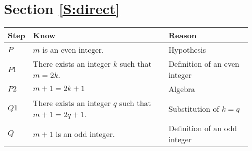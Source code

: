 \section*{Section \ref{S:direct}}

\begin{list}{\bf{\ref{exer:evenodd}.}}
\item \begin{list}{\bf{(a)}} \item 
\begin{tabular}[t]{|p{0.4in}|p{1.6in}|p{1.6in}|}
  \hline
  \textbf{Step}  &  \textbf{Know}  &  \textbf{Reason} \\ \hline
  $P$  &  $m$ is an even integer.  &  Hypothesis \\ \hline
  $P1$ &  There exists an integer $k$ such that $m = 2k$. &  Definition of an even integer \\ \hline
  $P2$  &  $m + 1 = 2k + 1$  &  Algebra \\ \hline
  $Q1$  &  There exists an integer $q$ such that $m +1 = 2q+1$.  &  Substitution of $k = q$ \\ \hline
  $Q$  &  $m + 1$ is an odd integer. &  Definition of an odd integer \\ \hline
\end{tabular}
\end{list}
\end{list}



